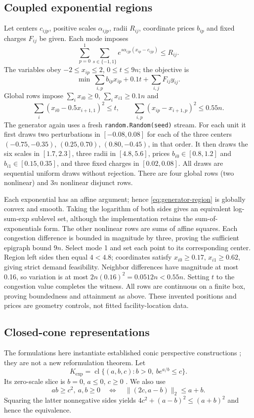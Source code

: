 \subsection{Coupled exponential regions}
Let centers $c_{ijp}$, positive scales $\alpha_{ijp}$, radii $R_{ij}$, coordinate prices $b_{ip}$ and fixed charges $F_{ij}$ be given. Each mode imposes
\begin{equation}\label{eq:generator-region}
 \sum_{p=0}^1\sum_{s\in\{-1,1\}}
 e^{s\alpha_{ijp}(x_{ip}-c_{ijp})}\le R_{ij}.
\end{equation}
The variables obey $-2\le x_{ip}\le2$, $0\le t\le9n$; the objective is
\[
 \min\ \sum_{i,p}b_{ip}x_{ip}+0.1t+\sum_{i,j}F_{ij}y_{ij}.
\]
Global rows impose $\sum_i x_{i0}\ge0$, $\sum_i x_{i1}\ge0.1n$ and
\[
 \sum_i(x_{i0}-0.5x_{i+1,1})^2\le t,\qquad
 \sum_{i,p}(x_{ip}-x_{i+1,p})^2\le0.55n.
\]
The generator again uses a fresh \texttt{random.Random(seed)} stream. For each unit it first draws two perturbations in $[-0.08,0.08]$ for each of the three centers $(-0.75,-0.35)$, $(0.25,0.70)$, $(0.80,-0.45)$, in that order. It then draws the six scales in $[1.7,2.3]$, three radii in $[4.8,5.6]$, prices $b_{i0}\in[0.8,1.2]$ and $b_{i1}\in[0.15,0.35]$, and three fixed charges in $[0.02,0.08]$. All draws are sequential uniform draws without rejection. There are four global rows (two nonlinear) and $3n$ nonlinear disjunct rows.

Each exponential has an affine argument; hence \eqref{eq:generator-region} is globally convex and smooth. Taking the logarithm of both sides gives an equivalent log-sum-exp sublevel set, although the implementation retains the sum-of-exponentials form. The other nonlinear rows are sums of affine squares. Each congestion difference is bounded in magnitude by three, proving the sufficient epigraph bound $9n$. Select mode 1 and set each point to its corresponding center. Region left sides then equal $4<4.8$; coordinates satisfy $x_{i0}\ge0.17$, $x_{i1}\ge0.62$, giving strict demand feasibility. Neighbor differences have magnitude at most 0.16, so variation is at most $2n(0.16)^2=0.0512n<0.55n$. Setting $t$ to the congestion value completes the witness. All rows are continuous on a finite box, proving boundedness and attainment as above. These invented positions and prices are geometry controls, not fitted facility-location data.

\subsection{Closed-cone representations}\label{app:cones}
The formulations here instantiate established conic perspective constructions \citep{ceria1999,bernal2024,gusev2026}; they are not a new reformulation theorem. Let
\[
 K_{\exp}=\operatorname{cl}\{(a,b,c):b>0,\ b e^{a/b}\le c\}.
\]
Its zero-scale slice is $b=0$, $a\le0$, $c\ge0$ \citep{cvxpycones}. We also use
\begin{equation}\label{eq:product-soc}
 ab\ge c^2,\ a,b\ge0
 \quad\Longleftrightarrow\quad
 \|(2c,a-b)\|_2\le a+b.
\end{equation}
Squaring the latter nonnegative sides yields $4c^2+(a-b)^2\le(a+b)^2$ and hence the equivalence.

